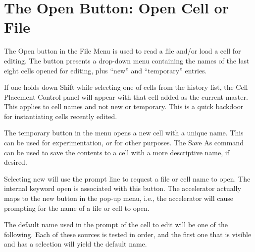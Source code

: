 \section{The {\cb Open} Button: Open Cell or File}
\label{editbut}

The {\cb Open} button in the {\cb File Menu} is used to read a file
and/or load a cell for editing.  The button presents a drop-down menu
containing the names of the last eight cells opened for editing, plus
``{\cb new}'' and ``{\cb temporary}'' entries.

If one holds down {\kb Shift} while selecting one of cells from the
history list, the {\cb Cell Placement Control} panel will appear with
that cell added as the current master.  This applies to cell names and
not {\cb new} or {\cb temporary}.  This is a quick backdoor for
instantiating cells recently edited.

The {\cb temporary} button in the menu opens a new cell with a unique
name.  This can be used for experimentation, or for other purposes. 
The {\cb Save As} command can be used to save the contents to a cell
with a more descriptive name, if desired.

Selecting {\cb new} will use the prompt line to request a file or cell
name to open.  The internal keyword {\vt open} is associated with this
button.  The accelerator actually maps to the {\cb new} button in the
pop-up menu, i.e., the accelerator will cause prompting for the name
of a file or cell to open.

The default name used in the prompt of the cell to edit will be one of
the following.  Each of these sources is tested in order, and the
first one that is visible and has a selection will yield the default
name.

